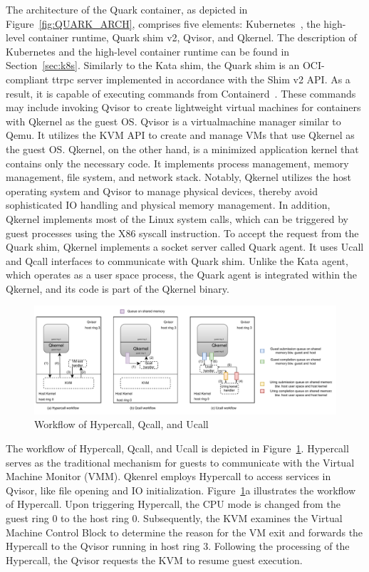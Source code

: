 The architecture of the Quark container, as depicted in Figure~\ref*{fig:QUARK_ARCH}, comprises five elements: Kubernetes~\cite*{k8s}, the high-level container runtime, Quark shim v2, Qvisor, and Qkernel. The description of Kubernetes and the high-level container runtime can be found in Section~\ref{sec:k8s}. 
Similarly to the Kata shim, the Quark shim is an OCI-compliant ttrpc server implemented in accordance with the Shim v2 API. As a result, it is capable of executing commands from Containerd~\cite*{containerd}. These commands may include invoking Qvisor to create lightweight virtual machines for 
containers with Qkernel as the guest OS. Qvisor is a virtualmachine manager similar to Qemu. It utilizes the KVM API to create and manage VMs that use Qkernel as the guest OS. Qkernel, on the other hand, is a minimized application kernel that contains only the necessary code. It implements process 
management, memory management, file system, and network stack. Notably, Qkernel utilizes the host operating system and Qvisor to manage physical devices, thereby avoid sophisticated IO handling and physical memory management. In addition, Qkernel implements most of the Linux system calls, which can be triggered by 
guest processes using the X86 syscall instruction. To accept the request from the Quark shim,  Qkernel implements a socket server called Quark agent. It uses Ucall 
and Qcall interfaces to communicate with Quark shim. Unlike the Kata agent, which operates as a user space process, the Quark agent is integrated within the Qkernel, and its code is part of the Qkernel binary.



\begin{figure}[htp]
  \centering
  \includegraphics[width=1\textwidth]{images/hypercall_qcall_ucall.pdf}
  \caption[Workflow of Hypercall, Qcall, and Ucall]{Workflow of Hypercall, Qcall, and Ucall}
  \label{fig:hypercall_qcall_ucall}
\end{figure}


The workflow of Hypercall, Qcall, and Ucall is depicted in Figure~\ref{fig:hypercall_qcall_ucall}. Hypercall serves as the traditional mechanism for guests to communicate with the Virtual Machine Monitor (VMM). Qkenrel employs Hypercall to access services in Qvisor, like file opening and IO 
initialization. Figure~\ref{fig:hypercall_qcall_ucall}a illustrates the workflow of Hypercall. Upon triggering Hypercall, the CPU mode is changed from the guest ring 0  to the host ring 0. Subsequently, the KVM examines the Virtual Machine Control Block to determine the reason for the VM exit and 
forwards the Hypercall to the Qvisor running in host ring 3. Following the processing of the Hypercall, the Qvisor requests the KVM to resume guest execution.

